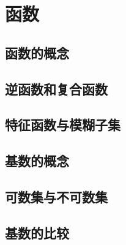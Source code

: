 \section{函数}

\subsection{函数的概念}

\subsection{逆函数和复合函数}

\subsection{特征函数与模糊子集}

\subsection{基数的概念}

\subsection{可数集与不可数集}

\subsection{基数的比较}
